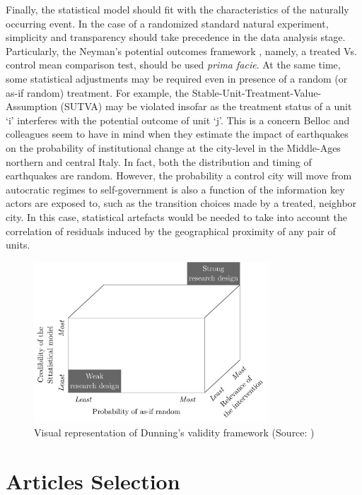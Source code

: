 \documentclass[11pt, english]{article}
\begin{document}
Finally, the statistical model should fit with the characteristics of the
naturally occurring event. In the case of a randomized standard natural
experiment, simplicity and transparency should take precedence in the data
analysis stage. Particularly, the Neyman's potential outcomes framework
\parencite[][]{Splawa1990}, namely, a treated Vs. control mean comparison test,
should be used \emph{prima facie}. At the same time, some statistical
adjustments may be required even in presence of a random (or as-if random)
treatment. For example, the Stable-Unit-Treatment-Value-Assumption (SUTVA) may
be violated insofar as the treatment status of a unit `i' interferes with the
potential outcome of unit `j'. This is a concern Belloc and colleagues
\parencite*[][]{Belloc2016} seem to have in mind when they estimate the impact
of earthquakes on the probability of institutional change at the city-level in
the Middle-Ages northern and central Italy. In fact, both the distribution and
timing of earthquakes are random. However, the probability a control city will
move from autocratic regimes to self-government is also a function of the
information key actors are exposed to, such as the transition choices made by a
treated, neighbor city. In this case, statistical artefacts would be needed to
take into account the correlation of residuals induced by the geographical
proximity of any pair of units.

\begin{figure}[]
    \centering
    \includegraphics[width=0.78\textwidth]{images/validity_framework.pdf}
    \caption{Visual representation of Dunning's validity framework (Source:
    \cite[][page 31]{Dunning2012})}
    \label{fig:validity_framework}
\end{figure}


\section{Articles Selection}
\label{sec:article_selection}
\end{document}
